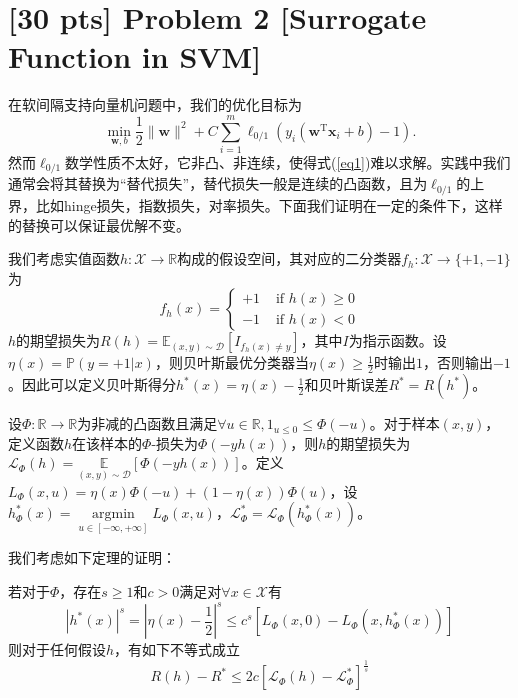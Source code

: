 \documentclass[a4paper,UTF8]{article}
\theoremstyle{definition}
\begin{document}
\section*{[30 pts] Problem 2 [Surrogate Function in SVM]}

在软间隔支持向量机问题中，我们的优化目标为
\begin{equation}\label{eq1}
\min _{\boldsymbol{w}, b} \frac{1}{2}\|\boldsymbol{w}\|^{2}+C \sum_{i=1}^{m} \ell_{0 / 1}\left(y_{i}\left(\boldsymbol{w}^{\mathrm{T}} \boldsymbol{x}_{i}+b\right)-1\right) . 
\end{equation}
然而$\ell_{0 / 1}$数学性质不太好，它非凸、非连续，使得式(\ref{eq1})难以求解。实践中我们通常会将其替换为“替代损失”，替代损失一般是连续的凸函数，且为$\ell_{0 / 1}$的上界，比如hinge损失，指数损失，对率损失。下面我们证明在一定的条件下，这样的替换可以保证最优解不变。

我们考虑实值函数$h:\mathcal{X}\rightarrow\mathbb{R}$构成的假设空间，其对应的二分类器$f_h:\mathcal{X}\rightarrow\{+1,-1\}$为
$$f_{h}(x)=\left\{\begin{array}{ll}
+1 & \text { if } h(x)\geqslant 0 \\
-1 & \text { if } h(x)<0
\end{array}\right.$$
$h$的期望损失为$R(h)=\mathbb{E}_{(x, y) \sim \mathcal{D}}\left[I_{f_{h}(x) \neq y}\right]$，其中$I$为指示函数。设$\eta(x)=\mathbb{P}(y=+1|x)$，则贝叶斯最优分类器当$\eta(x)\geqslant \frac{1}{2}$时输出$1$，否则输出$-1$。因此可以定义贝叶斯得分$h^*(x)=\eta(x)-\frac{1}{2}$和贝叶斯误差$R^*=R(h^*)$。

设$\Phi:\mathbb{R}\rightarrow\mathbb{R}$为非减的凸函数且满足$\forall u\in \mathbb{R},1_{u\leqslant 0}\leqslant \Phi(-u)$。对于样本$(x,y)$，定义函数$h$在该样本的$\Phi$-损失为$\Phi(-yh(x))$，则$h$的期望损失为$\mathcal{L}_{\Phi}(h)=\underset{(x, y) \sim \mathcal{D}}{\mathbb{E}}[\Phi(-y h(x))]$。定义$L_{\Phi}(x, u)=\eta(x) \Phi(-u)+(1-\eta(x)) \Phi(u)$，设$h_{\Phi}^{*}(x)=\underset{u \in[-\infty,+\infty]}{\operatorname{argmin}} L_{\Phi}(x, u)$，$\mathcal{L}_{\Phi}^{*}=\mathcal{L}_{\Phi}(h_{\Phi}^{*}(x))$。

我们考虑如下定理的证明：

若对于$\Phi$，存在$s\geqslant 1$和$c>0$满足对$\forall x\in\mathcal{X}$有
\begin{equation}\label{eq2}
\left|h^{*}(x)\right|^{s}=\left|\eta(x)-\frac{1}{2}\right|^{s} \leqslant c^{s}\left[L_{\Phi}(x, 0)-L_{\Phi}\left(x, h_{\Phi}^{*}(x)\right)\right]
\end{equation}
则对于任何假设$h$，有如下不等式成立
\begin{equation}\label{eq3}
R(h)-R^{*} \leqslant 2 c\left[\mathcal{L}_{\Phi}(h)-\mathcal{L}_{\Phi}^{*}\right]^{\frac{1}{s}}
\end{equation}
\end{document}
